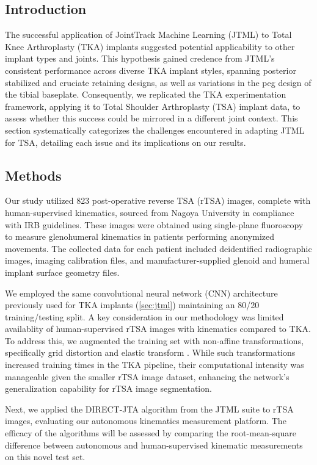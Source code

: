 \subsection{Introduction}
The successful application of JointTrack Machine Learning (JTML) to Total Knee Arthroplasty (TKA) implants suggested potential applicability to other implant types and joints.
This hypothesis gained credence from JTML's consistent performance across diverse TKA implant styles, spanning posterior stabilized and cruciate retaining designs, as well as variations in the peg design of the tibial baseplate.
Consequently, we replicated the TKA experimentation framework, applying it to Total Shoulder Arthroplasty (TSA) implant data, to assess whether this success could be mirrored in a different joint context.
This section systematically categorizes the challenges encountered in adapting JTML for TSA, detailing each issue and its implications on our results.

\subsection{Methods}
Our study utilized 823 post-operative reverse TSA (rTSA) images, complete with human-supervised kinematics, sourced from Nagoya University in compliance with IRB guidelines.
These images were obtained using single-plane fluoroscopy to measure glenohumeral kinematics in patients performing anonymized movements.
The collected data for each patient included deidentified radiographic images, imaging calibration files, and manufacturer-supplied glenoid and humeral implant surface geometry files.


We employed the same convolutional neural network (CNN) architecture previously used for TKA implants \cite{wangDeepHighResolutionRepresentation2020} (\cref{sec:jtml}) maintaining an 80/20 training/testing split.
A key consideration in our methodology was limited availablity of human-supervised rTSA images with kinematics compared to TKA.
To address this, we augmented the training set with non-affine transformations, specifically grid distortion and elastic transform \cite{buslaevAlbumentationsFastFlexible2020}.
While such transformations increased training times in the TKA pipeline, their computational intensity was manageable given the smaller rTSA image dataset, enhancing the network's generalization capability for rTSA image segmentation.

Next, we applied the DIRECT-JTA algorithm from the JTML suite to rTSA images, evaluating our autonomous kinematics measurement platform.
The efficacy of the algorithms will be assessed by comparing the root-mean-square difference between autonomous and human-supervised kinematic measurements on this novel test set.

